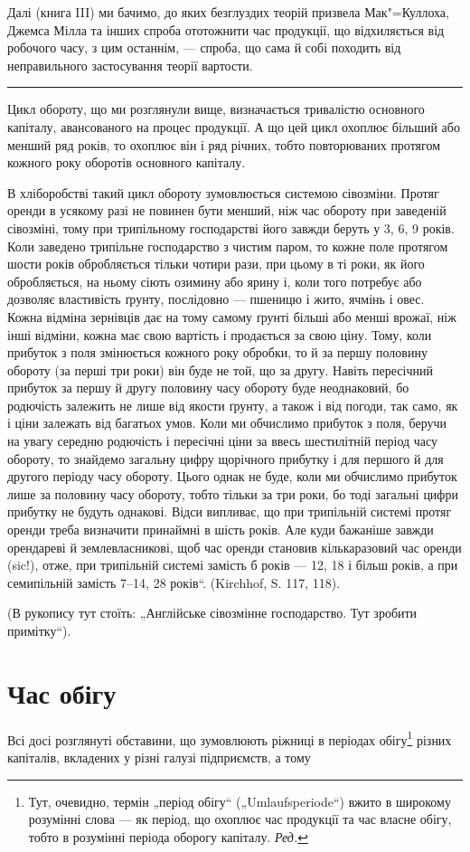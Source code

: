 Далі (книга III) ми бачимо, до яких безглуздих теорій призвела Мак"=Куллоха,
Джемса Мілла та інших спроба ототожнити час продукції, що відхиляється від робочого часу, з
цим останнім, — спроба, що сама й собі походить від неправильного застосування теорії вартости.

\pfbreak

Цикл обороту, що ми розглянули вище, визначається тривалістю основного капіталу, авансованого на
процес продукції. А що цей цикл охоплює більший або менший ряд років, то охоплює він і ряд річних,
тобто повторюваних протягом кожного року оборотів основного капіталу.

В хліборобстві такий цикл обороту зумовлюється системою сівозміни. Протяг оренди в усякому разі не
повинен бути менший, ніж час обороту при заведеній сівозміні, тому при трипільному господарстві його
завжди беруть у 3, 6, 9 років. Коли заведено трипільне господарство з чистим паром, то кожне поле
протягом шости років обробляється тільки чотири рази, при цьому в ті роки, як його обробляється, на
ньому сіють озимину або ярину і, коли того потребує або дозволяє властивість ґрунту, послідовно —
пшеницю і жито, ячмінь і овес. Кожна відміна зернівців дає на тому самому ґрунті більші або менші
врожаї, ніж інші відміни, кожна має свою вартість і продається за свою ціну. Тому, коли прибуток з
поля змінюється кожного року обробки, то й за першу половину обороту (за перші три роки) він буде не
той, що за другу. Навіть пересічний прибуток за першу й другу половину часу обороту буде
неоднаковий, бо родючість залежить не лише від якости ґрунту, а також і від погоди, так само, як і
ціни залежать від багатьох умов. Коли ми обчислимо прибуток з поля, беручи на увагу середню
родючість і пересічні ціни за ввесь шестилітній період часу обороту, то знайдемо загальну цифру
щорічного прибутку і для першого й для другого періоду часу обороту. Цього однак не буде, коли ми
обчислимо прибуток лише за половину часу обороту, тобто тільки за три роки, бо тоді загальні цифри
прибутку не будуть однакові. Відси випливає, що при трипільній системі протяг оренди треба визначити
принаймні в шість років. Але куди бажаніше завжди орендареві й землевласникові, щоб час оренди
становив кількаразовий час оренди (sic!), отже, при трипільній системі замість б років — 12, 18 і
більш років, а при семипільній замість 7--14, 28 років“. (Kirchhof, S. 117, 118).

(В рукопису тут стоїть: „Англійське сівозмінне господарство. Тут зробити примітку“).

\section{Час обігу}

Всі досі розглянуті обставини, що зумовлюють ріжниці в періодах обігу\footnote{
Тут, очевидно, термін „період обігу“ („Umlaufsperiode“) вжито в широкому розумінні слова — як
період, що охоплює час продукції та час власне обігу, тобто в розумінні періода оборогу капіталу.
\emph{Ред.}
} різних капіталів, вкладених у
різні галузі підприємств, а тому
\parbreak{}  %
